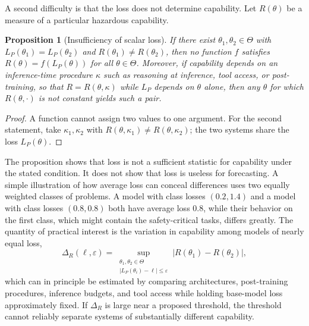 \documentclass[11pt]{article}
\newtheorem{proposition}{Proposition}
\theoremstyle{definition}
\theoremstyle{remark}
\begin{document}
A second difficulty is that the loss does not determine capability. Let $R(\theta)$ be a measure of a particular hazardous capability.

\begin{proposition}[Insufficiency of scalar loss]
\label{prop:scalar}
If there exist $\theta_1,\theta_2\in\Theta$ with $L_P(\theta_1)=L_P(\theta_2)$ and $R(\theta_1)\ne R(\theta_2)$, then no function $f$ satisfies $R(\theta)=f(L_P(\theta))$ for all $\theta\in\Theta$. Moreover, if capability depends on an inference-time procedure $\kappa$ such as reasoning at inference, tool access, or post-training, so that $R=R(\theta,\kappa)$ while $L_P$ depends on $\theta$ alone, then any $\theta$ for which $R(\theta,\cdot)$ is not constant yields such a pair.
\end{proposition}

\begin{proof}
A function cannot assign two values to one argument. For the second statement, take $\kappa_1,\kappa_2$ with $R(\theta,\kappa_1)\ne R(\theta,\kappa_2)$; the two systems share the loss $L_P(\theta)$.
\end{proof}

The proposition shows that loss is not a sufficient statistic for capability under the stated condition. It does not show that loss is useless for forecasting. A simple illustration of how average loss can conceal differences uses two equally weighted classes of problems. A model with class losses $(0.2,1.4)$ and a model with class losses $(0.8,0.8)$ both have average loss $0.8$, while their behavior on the first class, which might contain the safety-critical tasks, differs greatly. The quantity of practical interest is the variation in capability among models of nearly equal loss,
\begin{equation}
\Delta_R(\ell,\varepsilon)=\sup_{\substack{\theta_1,\theta_2\in\Theta\\|L_P(\theta_i)-\ell|\le\varepsilon}}\big|R(\theta_1)-R(\theta_2)\big|,
\end{equation}
which can in principle be estimated by comparing architectures, post-training procedures, inference budgets, and tool access while holding base-model loss approximately fixed. If $\Delta_R$ is large near a proposed threshold, the threshold cannot reliably separate systems of substantially different capability.
\end{document}
